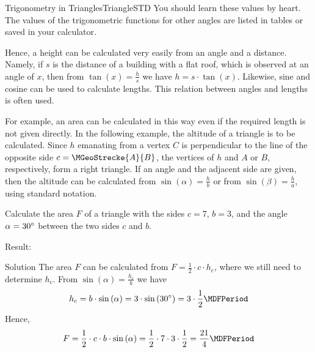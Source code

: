 \begin{MXContent}{Trigonometry in Triangles}{Triangle}{STD}
You should learn these values by heart. The values of the trigonometric functions for other
angles are listed in tables or saved in your calculator.

Hence, a height can be calculated very easily from an angle and a distance. 
Namely, if $s$ is the distance of a building with a flat roof, which is observed 
at an angle of $x$, then from $\tan(x) = \frac{h}{s}$ we have  $h = s \cdot \tan(x)$. 
Likewise, sine and cosine can be used to calculate lengths. This relation between 
angles and lengths is often used.

For example, an area can be calculated in this way even if the required 
length is not given directly. In the following example, the altitude
of a triangle is to be calculated. Since $h$ emanating from a vertex $C$ 
is perpendicular to the line of the opposite side
$c = \MGeoStrecke{A}{B}$, the vertices of $h$ and  $A$ or $B$, respectively, 
form a right triangle. If an angle and the adjacent side are given, then 
the altitude can be calculated from $\sin(\alpha) = \frac{h}{b}$ or from
$\sin(\beta) = \frac{h}{a}$, using standard notation.


\begin{MExercise}
Calculate the area $F$ of a triangle with the sides $c = 7$, $b = 3$,  and 
the angle $\alpha = 30^{\circ}$ between the two sides $c$ and $b$.

Result: %

\begin{MHint}{Solution}
The area $F$ can be calculated from $F =\frac{1}{2}\cdot c \cdot h_c$, where we
still need to determine $h_c$. From $\sin\left(\alpha\right)=\frac{h_c}{b}$
we have
\[
 h_c=b\cdot\sin\left(\alpha\right) %
  = 3\cdot\sin\left(30\MGrad\right) %
  = 3\cdot\frac{1}{2} \MDFPeriod %
\]
Hence,
\[ 
F =\frac{1}{2}\cdot c\cdot b\cdot\sin\left(\alpha\right) %
  =\frac{1}{2}\cdot 7 \cdot3\cdot\frac{1}{2}=\frac{21}{4} \MDFPeriod %
\]
\end{MHint}
\end{MExercise}

\end{MXContent}


